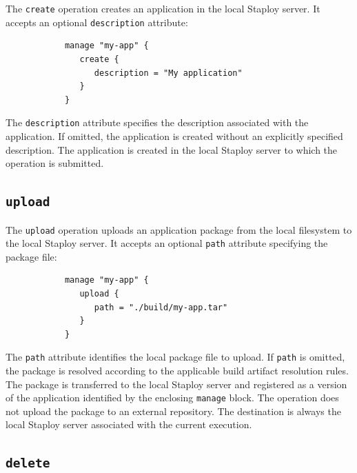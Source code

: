 \documentclass[11pt,a4paper]{article}
\begin{document}
    The \texttt{create} operation creates an application in the local Staploy server.
    It accepts an optional \texttt{description} attribute:

    \begin{center}
        \begin{verbatim}
            manage "my-app" {
               create {
                  description = "My application"
               }
            }
        \end{verbatim}
    \end{center}

    The \texttt{description} attribute specifies the description associated with the application.
    If omitted, the application is created without an explicitly specified description.
    The application is created in the local Staploy server to which the operation is submitted.

    \subsection{\texttt{upload}}\label{subsec:texttt:upload}

    The \texttt{upload} operation uploads an application package from the local filesystem to the local Staploy server.
    It accepts an optional \texttt{path} attribute specifying the package file:

    \begin{center}
        \begin{verbatim}
            manage "my-app" {
               upload {
                  path = "./build/my-app.tar"
               }
            }
        \end{verbatim}
    \end{center}

    The \texttt{path} attribute identifies the local package file to upload.
    If \texttt{path} is omitted, the package is resolved according to the applicable build artifact resolution rules.
    The package is transferred to the local Staploy server and registered as a version of the application identified by the enclosing \texttt{manage} block.
    The operation does not upload the package to an external repository.
    The destination is always the local Staploy server associated with the current execution.

    \subsection{\texttt{delete}}\label{subsec:texttt:delete}
\end{document}
